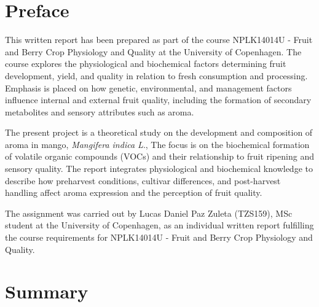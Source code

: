 \setlength{\headheight}{12.71342pt}
\addtolength{\topmargin}{-0.71342pt}


\section*{Preface}
This written report has been prepared as part of the course NPLK14014U - Fruit and Berry Crop Physiology and Quality at the University of Copenhagen. The course explores the physiological and biochemical factors determining fruit development, yield, and quality in relation to fresh consumption and processing. Emphasis is placed on how genetic, environmental, and management factors influence internal and external fruit quality, including the formation of secondary metabolites and sensory attributes such as aroma.

\vspace{1em}
The present project is a theoretical study on the development and composition of aroma in mango, \textit{Mangifera indica L}., The focus is on the biochemical formation of volatile organic compounds (VOCs) and their relationship to fruit ripening and sensory quality. The report integrates physiological and biochemical knowledge to describe how preharvest conditions, cultivar differences, and post-harvest handling affect aroma expression and the perception of fruit quality.

\vspace{1em}
The assignment was carried out by Lucas Daniel Paz Zuleta (TZS159), MSc student at the University of Copenhagen, as an individual written report fulfilling the course requirements for NPLK14014U - Fruit and Berry Crop Physiology and Quality.

\section*{Summary}



